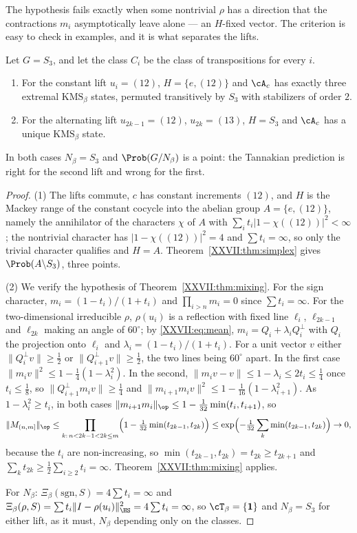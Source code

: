 The hypothesis fails exactly when some nontrivial $\rho$ has a direction that the
contractions $m_i$ asymptotically leave alone --- an $H$-fixed vector. The criterion is
easy to check in examples, and it is what separates the lifts.

\begin{theorem}\label{XXVII:thm:lift}
Let $G=S_3$, and let the class $C_i$ be the class of transpositions for every $i$.
\begin{enumerate}
\item For the constant lift $u_i=(12)$, $H=\{e,(12)\}$ and $\cA_c$ has exactly three
extremal $\mathrm{KMS}_\beta$ states, permuted transitively by $S_3$ with stabilizers of
order $2$.
\item For the alternating lift $u_{2k-1}=(12)$, $u_{2k}=(13)$, $H=S_3$ and $\cA_c$ has a
unique $\mathrm{KMS}_\beta$ state.
\end{enumerate}
In both cases $N_\beta=S_3$ and $\Prob(G/N_\beta)$ is a point: the Tannakian prediction is
right for the second lift and wrong for the first.
\end{theorem}

\begin{proof}
(1) The lifts commute, $c$ has constant increments $(12)$, and $H$ is the Mackey range of
the constant cocycle into the abelian group $A=\{e,(12)\}$, namely the annihilator of the
characters $\chi$ of $A$ with $\sum_it_i|1-\chi((12))|^2<\infty$; the nontrivial character
has $|1-\chi((12))|^2=4$ and $\sum t_i=\infty$, so only the trivial character qualifies and
$H=A$. Theorem~\ref{XXVII:thm:simplex} gives $\Prob(A\backslash S_3)$, three points.

(2) We verify the hypothesis of Theorem~\ref{XXVII:thm:mixing}. For the sign character,
$m_i=(1-t_i)/(1+t_i)$ and $\prod_{i>n}m_i=0$ since $\sum t_i=\infty$. For the two-dimensional
irreducible $\rho$, $\rho(u_i)$ is a reflection with fixed line $\ell_i$, $\ell_{2k-1}$ and
$\ell_{2k}$ making an angle of $60^\circ$; by \eqref{XXVII:eq:mean}, $m_i=Q_i+\lambda_iQ_i^\perp$
with $Q_i$ the projection onto $\ell_i$ and $\lambda_i=(1-t_i)/(1+t_i)$. For a unit vector $v$
either $\|Q_i^\perp v\|\ge\frac12$ or $\|Q_{i+1}^\perp v\|\ge\frac12$, the two lines being
$60^\circ$ apart. In the first case $\|m_iv\|^2\le1-\frac14(1-\lambda_i^2)$. In the second,
$\|m_iv-v\|\le1-\lambda_i\le2t_i\le\frac14$ once $t_i\le\frac18$, so
$\|Q_{i+1}^\perp m_iv\|\ge\frac14$ and $\|m_{i+1}m_iv\|^2\le1-\frac1{16}(1-\lambda_{i+1}^2)$.
As $1-\lambda_i^2\ge t_i$, in both cases
$\|m_{i+1}m_i\|_{\op}\le1-\frac1{32}\min(t_i,t_{i+1})$, so
\[
\|M_{(n,m]}\|_{\op}\le\prod_{k:\,n<2k-1<2k\le m}\Bigl(1-\tfrac1{32}\min(t_{2k-1},t_{2k})\Bigr)\le\exp\Bigl(-\tfrac1{32}\sum_{k}\min(t_{2k-1},t_{2k})\Bigr)\to0,
\]
because the $t_i$ are non-increasing, so $\min(t_{2k-1},t_{2k})=t_{2k}\ge t_{2k+1}$ and
$\sum_kt_{2k}\ge\frac12\sum_{i\ge2}t_i=\infty$. Theorem~\ref{XXVII:thm:mixing} applies.

For $N_\beta$: $\Xi_\beta(\mathrm{sgn},S)=4\sum t_i=\infty$ and
$\Xi_\beta(\rho,S)=\sum t_i\|I-\rho(u_i)\|_{\HS}^2=4\sum t_i=\infty$, so $\cT_\beta=\{\mathbf 1\}$
and $N_\beta=S_3$ for either lift, as it must, $N_\beta$ depending only on the classes.
\end{proof}

